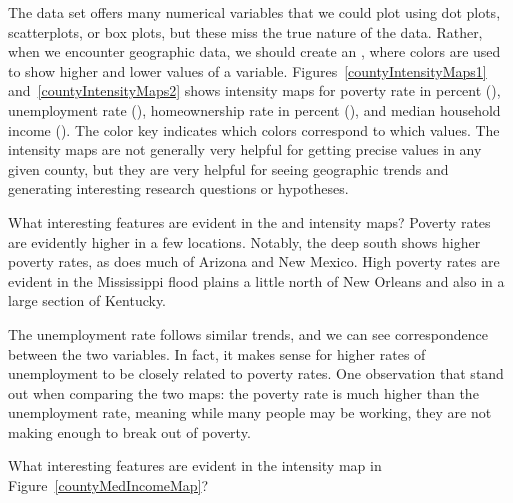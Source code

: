 
The  data set offers many numerical variables
that we could plot using dot plots, scatterplots,
or box plots, but these miss the true nature of the data.
Rather, when we encounter geographic data, we should create
an , where colors are used
to show higher and lower values of a variable.
Figures~\ref{countyIntensityMaps1}
and~\ref{countyIntensityMaps2} shows intensity maps for
poverty rate in percent (),
unemployment rate (),
homeownership rate in percent (),
and median household income
().
The color key indicates which colors correspond to which values.
The intensity maps are not generally very helpful
for getting precise values in any given county,
but they are very helpful for seeing geographic trends
and generating interesting research questions or hypotheses.

\begin{examplewrap}
\begin{nexample}{What interesting features are evident in the
     and 
    intensity maps?}
  Poverty rates are evidently higher in a few locations.
  Notably, the deep south shows higher poverty rates,
  as does much of Arizona and New Mexico.
  High poverty rates are evident in the Mississippi
  flood plains a little north of New Orleans and
  also in a large section of Kentucky.

  The unemployment rate follows similar trends,
  and we can see correspondence between the two
  variables. In fact, it makes sense for higher rates
  of unemployment to be closely related to poverty rates.
  One observation that stand out when comparing the two maps:
  the poverty rate is much higher than the unemployment
  rate, meaning while many people may be working,
  they are not making enough to break out of poverty.
\end{nexample}
\end{examplewrap}

\begin{exercisewrap}
\begin{nexercise}
What interesting features are evident in the
 intensity map in
Figure~\ref{countyMedIncomeMap}?\footnotemark{}
\end{nexercise}
\end{exercisewrap}

